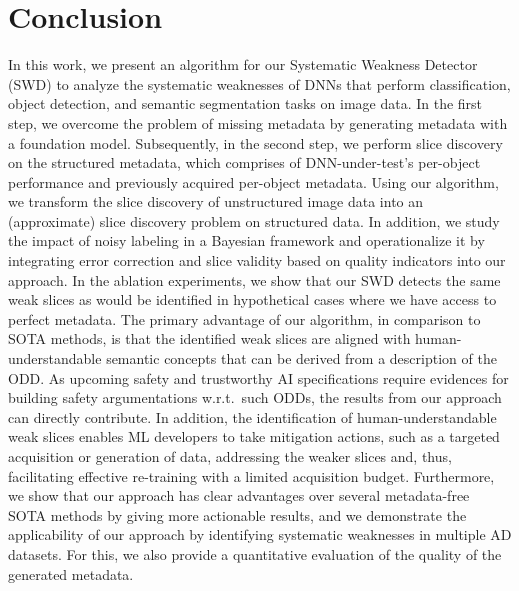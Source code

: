 \section{Conclusion}
\label{sec:conclusion}


In this work, we present an algorithm for our Systematic Weakness Detector (SWD) to analyze the systematic weaknesses of DNNs that perform classification, object detection, and semantic segmentation tasks on image data. In the first step, we overcome the problem of missing metadata by generating metadata with a foundation model. Subsequently, in the second step, we perform slice discovery on the structured metadata, which comprises of DNN-under-test's per-object performance and previously acquired per-object metadata. Using our algorithm, we transform the slice discovery of unstructured image data into an (approximate) slice discovery problem on structured data.
In addition, we study the impact of noisy labeling in a Bayesian framework and operationalize it by integrating error correction and slice validity based on quality indicators into our approach.
In the ablation experiments, we show that our SWD detects the same weak slices as would be identified in hypothetical cases where we have access to perfect metadata.
The primary advantage of our algorithm, in comparison to SOTA methods, is that the identified weak slices are aligned with human-understandable semantic concepts that can be derived from a description of the ODD.
As upcoming safety and trustworthy AI specifications require evidences for building safety argumentations w.r.t.\ such ODDs, the results from our approach can directly contribute.
In addition, the identification of human-understandable weak slices enables ML developers to take mitigation actions, such as a targeted acquisition or generation of data, addressing the weaker slices and, thus, facilitating effective re-training with a limited acquisition budget.
Furthermore, we show that our approach has clear advantages over several metadata-free SOTA methods by giving more actionable results, and we demonstrate the applicability of our approach by identifying systematic weaknesses in multiple AD datasets.
For this, we also provide a quantitative evaluation of the quality of the generated metadata. 

